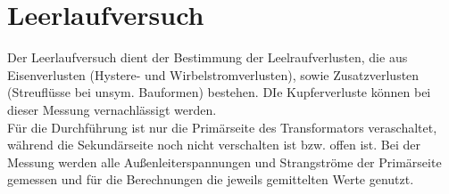 \section{Leerlaufversuch}
Der Leerlaufversuch dient der Bestimmung der Leelraufverlusten,  die aus Eisenverlusten (Hystere- und Wirbelstromverlusten), sowie Zusatzverlusten  (Streuflüsse  bei  unsym.   Bauformen)  bestehen. DIe Kupferverluste können bei dieser Messung vernachlässigt werden.\\
Für die Durchführung ist nur die Primärseite des Transformators veraschaltet, während die Sekundärseite noch nicht verschalten ist bzw. offen ist. 
Bei der Messung werden alle Außenleiterspannungen und Strangströme der Primärseite gemessen und für die Berechnungen die jeweils gemittelten Werte genutzt.



